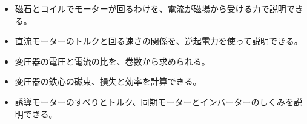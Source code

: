 \makeatletter
\newcommand\sxmmag[5]{\filldraw[fill=#5, draw=bkInk, line width=0.8pt] #1 rectangle ++(#2,#3); \node[font=\sffamily\small\bfseries, text=bkInk] at ($#1+(#2/2,#3/2)$) {#4};}
\newcommand\sxmres[2]{\draw[bkInk, line width=0.8pt, decorate, decoration={zigzag, segment length=1.6mm, amplitude=1.1mm, pre length=1.5mm, post length=1.5mm}] #1 -- #2;}
\newcommand\sxmcoil[2]{\draw[bkInk, line width=0.8pt, decorate, decoration={coil, aspect=0.5, segment length=2.2mm, amplitude=1.6mm, pre length=1.2mm, post length=1.2mm}] #1 -- #2;}
\makeatother


\begin{goal}
\begin{itemize}[label={\color{bkTheme}●}, leftmargin=1.6\zw, itemsep=0pt, topsep=1pt]
\item {}\enspace 磁石とコイルでモーターが回るわけを、電流が磁場から受ける力で説明できる。
\item {}\enspace 直流モーターのトルクと回る速さの関係を、逆起電力を使って説明できる。
\item {}\enspace 変圧器の電圧と電流の比を、巻数から求められる。
\item {}\enspace 変圧器の鉄心の磁束、損失と効率を計算できる。
\item {}\enspace 誘導モーターのすべりとトルク、同期モーターとインバーターのしくみを説明できる。
\end{itemize}
\end{goal}

